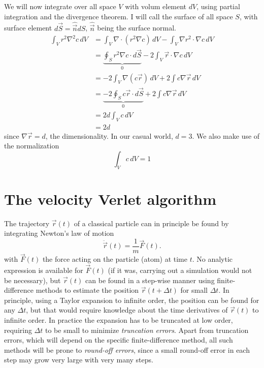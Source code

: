 \documentclass[11pt,bibliography=totoc,index=totoc]{scrbook}   %
\begin{document}
We will now integrate over all space $V$ with volum element $dV$, using partial integration and the divergence theorem.
I will call the surface of all space $S$, with surface element $d\vec{S}=\hat{\vec{n}}dS$, $\hat{\vec{n}}$ being the surface normal.
\begin{align}
  \int_V r^2 \nabla^2 c \,dV &= \int_V \nabla\cdot (r^2\nabla c) \,dV - \int_V \nabla r^2 \cdot \nabla c \, dV \\
  &= \underbrace{\oint_S r^2 \nabla c \cdot d\vec{S}}_0 - 2\int_V \vec{r}\cdot\nabla c \,dV \\
  &= -2\int_V \nabla (c\vec{r}) \,dV + 2 \int c \nabla \vec{r} \, dV \\
  &= \underbrace{-2\oint_S c\vec{r}\cdot d\vec{S}}_0 + 2 \int c \nabla \vec{r} \, dV \\
  &= 2d\int_V c \, dV \\
  &= 2d
\end{align}
since $\nabla\vec{r} = d$, the dimensionality. In our casual world, $d=3$. We also make use of the normalization
\begin{equation}
  \int_V c \,dV = 1
\end{equation}


%
\section{The velocity Verlet algorithm}\label{sec:verlet-algo}
%

The trajectory $\vec{r}(t)$ of a classical particle can in principle be found by integrating Newton's law of motion
\begin{equation}
  \ddot{\vec{r}}(t) = \frac{1}{m}\vec{F}(t).
\end{equation}
with $\vec{F}(t)$ the force acting on the particle (atom) at time $t$. 
No analytic expression is available for $\vec{F}(t)$ (if it was, carrying out a simulation would not be necessary),
but $\vec{r}(t)$ can be found in a step-wise manner using finite-difference methods 
to estimate the position $\vec{r}(t+\Delta t)$ for small $\Delta t$. 
In principle, using a Taylor expansion to infinite order, the position can be found for any $\Delta t$, but that would require knowledge about the time derivatives of $\vec{r}(t)$ to infinite order. 
In practice the expansion has to be truncated at low order, requiring $\Delta t$ to be small to minimize \emph{truncation errors}.
Apart from truncation errors, which will depend on the specific finite-difference method, all such methods will be prone to \emph{round-off errors}, since a small round-off error in each step may grow very large with very many steps.
\end{document}
